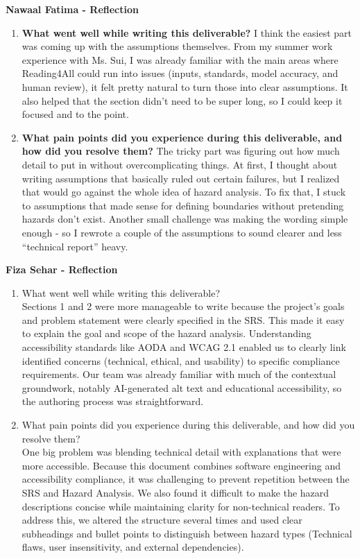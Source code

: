 \documentclass{article}
\begin{document}
\textbf{Nawaal Fatima  - Reflection}
\begin{enumerate}
  \item \textbf{What went well while writing this deliverable?}\newline
    I think the easiest part was coming up with the assumptions
    themselves. From my summer work experience with Ms. Sui, I was already familiar with the main areas where Reading4All
    could run into issues (inputs, standards, model accuracy, and
    human review), it felt pretty natural to turn those into clear
    assumptions. It also helped that the section didn’t need to be
    super long, so I could keep it focused and to the point.

  \item \textbf{What pain points did you experience during this
    deliverable, and how did you resolve them?}\newline
    The tricky part was figuring out how much detail to put in
    without overcomplicating things. At first, I thought about
    writing assumptions that basically ruled out certain failures,
    but I realized that would go against the whole idea of hazard
    analysis. To fix that, I stuck to assumptions that made sense for
    defining boundaries without pretending hazards don’t exist.
    Another small challenge was making the wording simple enough - so
    I rewrote a couple of the assumptions to sound clearer and less
    ``technical report'' heavy.
\end{enumerate}
\textbf{Fiza Sehar  - Reflection}
\begin{enumerate}
    \item What went well while writing this deliverable? \\[1ex]
    Sections 1 and 2 were more manageable to write because the project's goals 
    and problem statement were clearly specified in the SRS. This made 
    it easy to explain the goal and scope of the hazard analysis. Understanding 
    accessibility standards like AODA and WCAG 2.1 enabled us to clearly link 
    identified concerns (technical, ethical, and usability) to specific compliance 
    requirements. Our team was already familiar with much of the contextual 
    groundwork, notably AI-generated alt text and educational accessibility, so 
    the authoring process was straightforward.

    
    \item What pain points did you experience during this deliverable, and how
    did you resolve them?\\[1ex]
    One big problem was blending technical detail with explanations that were 
    more accessible. Because this document combines software engineering and 
    accessibility compliance, it was challenging to prevent repetition between 
    the SRS and Hazard Analysis. We also found it difficult to make the hazard 
    descriptions concise while maintaining clarity for non-technical readers. 
    To address this, we altered the structure several times and used clear subheadings 
    and bullet points to distinguish between hazard types (Technical flaws, user insensitivity, 
    and external dependencies).
\end{enumerate}
    
\end{document}
